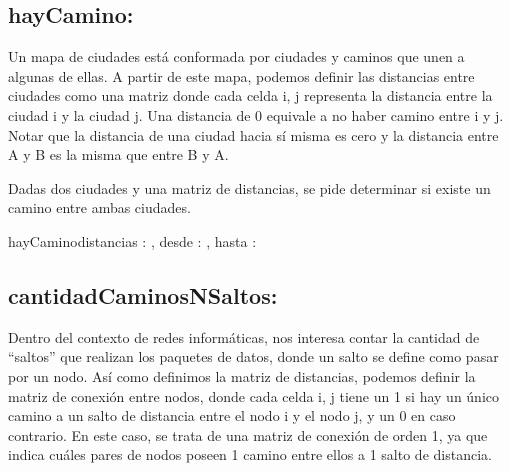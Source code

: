 \documentclass[10pt,a4paper]{article}
\begin{document}

\subsection{hayCamino:}

Un mapa de ciudades está conformada por ciudades y caminos que unen a algunas de ellas.
A partir de este mapa, podemos definir las distancias entre ciudades como una matriz donde cada celda i, j representa la distancia entre la ciudad i y la ciudad j. Una distancia de 0 equivale a no haber camino entre i y j.
Notar que la distancia de una ciudad hacia sí misma es cero y la distancia entre A y B es la misma que entre B y A.

Dadas dos ciudades y una matriz de distancias, se pide determinar si existe un camino entre ambas ciudades.

\begin{proc}{hayCamino}{\In distancias : \TLista{\TLista{\ent}}, \In desde : \ent, \In hasta : \ent}{\bool}
\end{proc}



\newpage
\subsection{cantidadCaminosNSaltos:}

Dentro del contexto de redes informáticas, nos interesa contar la cantidad de “saltos” que realizan los paquetes de datos, donde un salto se define como pasar por un nodo.
Así como definimos la matriz de distancias, podemos definir la matriz de conexión entre nodos, donde cada celda i, j tiene un 1 si hay un único camino a un salto de distancia entre el nodo i y el nodo j, y un 0 en caso contrario.
En este caso, se trata de una matriz de conexión de orden 1, ya que indica cuáles pares de nodos poseen 1 camino entre ellos a 1 salto de distancia.
\end{document}
